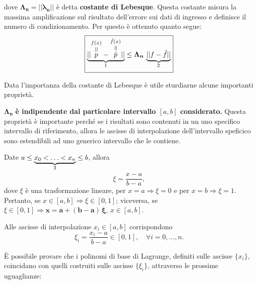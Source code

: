 \noindent dove $\boldsymbol{\Lambda_n=||\lambda_n||}$ è detta \textbf{costante di Lebesque}. Questa costante misura la massima amplificazione sul risultato dell'errore sui dati di ingresso e definisce il numero di condizionamento. Per questo è ottenuto quanto segue:
\begin{equation}\label{eq:maggPertDiffPTildeP}
    \boxed{\underbrace{||\equaltoup{p}{f(x)}-\equaltoup{\Tilde{p}}{\Tilde{f}(x)}||}_{\footnotemark}\leq\boldsymbol{\Lambda_n}\,\underbrace{||f-\Tilde{f}||}_{\footnotemark}}
\end{equation}

\addtocounter{footnote}{-1}


Data l'importanza della costante di Lebesque è utile sturdiarne alcune importanti proprietà.

\noindent$\boldsymbol{\Lambda_n}$ \textbf{è indipendente dal particolare intervallo $[a,b]$ considerato.} Questa proprietà è importante perché se i risultati sono contenuti in un uno specifico intervallo di riferimento, allora le ascisse di interpolazione dell'intervallo speficico sono estendibili ad uno generico intervallo che le contiene.

Date $a\leq\underbrace{x_0<\hdots<x_n}_{\footnotemark}\leq b$, allora
\begin{equation}\label{eq:xi}
    \xi=\frac{x-a}{b-a}, 
\end{equation}
dove $\xi$ è una trasformazione lineare, per $x=a\Rightarrow\xi = 0$ e per $x=b\Rightarrow\xi = 1$. Pertanto, se $x\in [a,b] \Rightarrow\xi\in [0,1]$; viceversa, se $\xi\in [0,1]\Rightarrow \boldsymbol{x=a+(b-a)\,\xi},\, x\in [a,b]$.


Alle ascisse di interpolazione $x_i\in [a,b]$ corrispondono
\begin{equation}\label{eq:xii}
    \xi_i=\frac{x_i-a}{b-a}\in [0,1],\quad \forall i=0,\hdots,n.
\end{equation}

È possibile provare che i polinomi di base di Lagrange, definiti sulle ascisse $\{x_i\}$, coincidano con quelli costruiti sulle ascisse $\{\xi_i\}$, attraverso le prossime uguaglianze:

